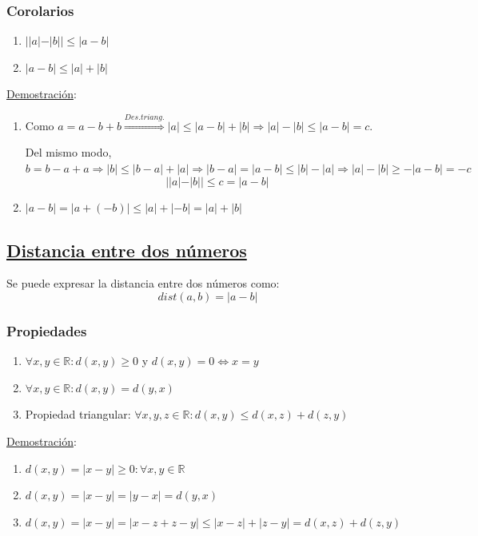 \documentclass[10pt,a4paper,openright]{book}
\theoremstyle{break}
\begin{document}
\subsubsection{Corolarios}
\begin{enumerate}
\item $||a|-|b||\leq |a-b|$
\item $|a-b|\leq |a|+|b|$
\end{enumerate}
\underline{Demostración}:
\begin{enumerate}
\item Como $a=a-b+b\stackrel{Des.triang.}{\Rightarrow} |a|\leq |a-b|+|b|\Rightarrow |a|-|b|\leq |a-b|=c$.\par
Del mismo modo, $b=b-a+a\Rightarrow |b|\leq |b-a|+|a|\Rightarrow |b-a|=|a-b|\leq |b|-|a|\Rightarrow |a|-|b|\geq -|a-b|=-c$
$$||a|-|b||\leq c=|a-b|$$

\item $|a-b|=|a+(-b)|\leq |a|+|-b|=|a|+|b|$
\end{enumerate}

\subsection{\underline{Distancia entre dos números}}
Se puede expresar la distancia entre dos números como:
$$dist(a,b)=|a-b|$$

\subsubsection{Propiedades}
\begin{enumerate}
\item $\forall x,y\in \mathbb R: d(x,y)\geq 0$ y $d(x,y)=0\Leftrightarrow x=y$

\item $\forall x,y\in \mathbb R: d(x,y)=d(y,x)$

\item Propiedad triangular: $\forall x,y,z\in \mathbb R : d(x,y)\leq d(x,z)+d(z,y)$
\end{enumerate}

\underline{Demostración}:
\begin{enumerate}
\item $d(x,y)=|x-y|\geq 0 : \forall x,y\in \mathbb R$

\item $d(x,y)=|x-y|=|y-x|=d(y,x)$

\item $d(x,y)=|x-y|=|x-z+z-y|\leq |x-z|+|z-y|=d(x,z)+d(z,y)$
\end{enumerate}
\end{document}
